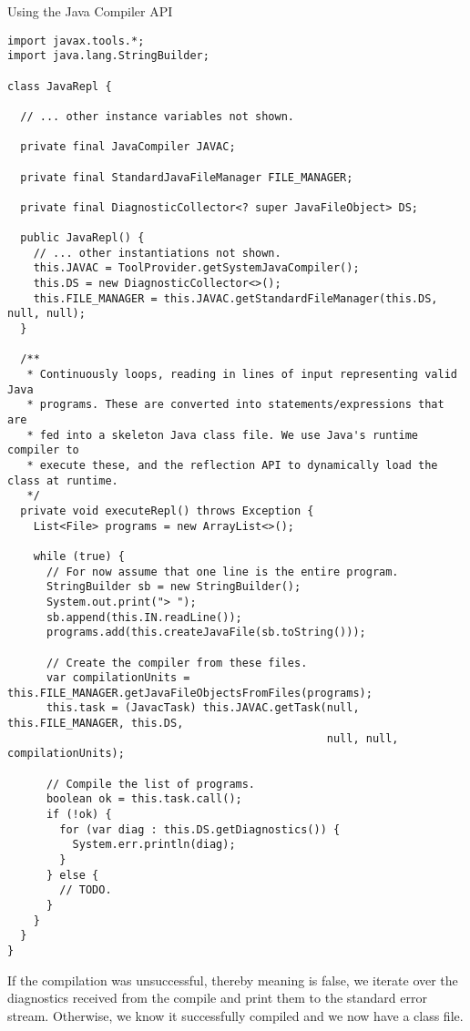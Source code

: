 \begin{cl}[]{Using the Java Compiler API}
\begin{lstlisting}[language=MyJava]
import javax.tools.*;
import java.lang.StringBuilder;

class JavaRepl {

  // ... other instance variables not shown.

  private final JavaCompiler JAVAC;

  private final StandardJavaFileManager FILE_MANAGER;

  private final DiagnosticCollector<? super JavaFileObject> DS;

  public JavaRepl() {
    // ... other instantiations not shown.
    this.JAVAC = ToolProvider.getSystemJavaCompiler();
    this.DS = new DiagnosticCollector<>();
    this.FILE_MANAGER = this.JAVAC.getStandardFileManager(this.DS, null, null);
  }

  /**
   * Continuously loops, reading in lines of input representing valid Java
   * programs. These are converted into statements/expressions that are
   * fed into a skeleton Java class file. We use Java's runtime compiler to
   * execute these, and the reflection API to dynamically load the class at runtime.
   */
  private void executeRepl() throws Exception {
    List<File> programs = new ArrayList<>();

    while (true) {
      // For now assume that one line is the entire program.
      StringBuilder sb = new StringBuilder();
      System.out.print("> ");
      sb.append(this.IN.readLine());
      programs.add(this.createJavaFile(sb.toString()));

      // Create the compiler from these files.
      var compilationUnits = this.FILE_MANAGER.getJavaFileObjectsFromFiles(programs);
      this.task = (JavacTask) this.JAVAC.getTask(null, this.FILE_MANAGER, this.DS,
                                                 null, null, compilationUnits);

      // Compile the list of programs.
      boolean ok = this.task.call();
      if (!ok) {
        for (var diag : this.DS.getDiagnostics()) {
          System.err.println(diag);
        }
      } else {
        // TODO.
      }
    }
  }
}
\end{lstlisting}
\end{cl}

If the compilation was unsuccessful, thereby meaning  is false, we iterate over the diagnostics received from the compile and print them to the standard error stream. Otherwise, we know it successfully compiled and we now have a class file.

